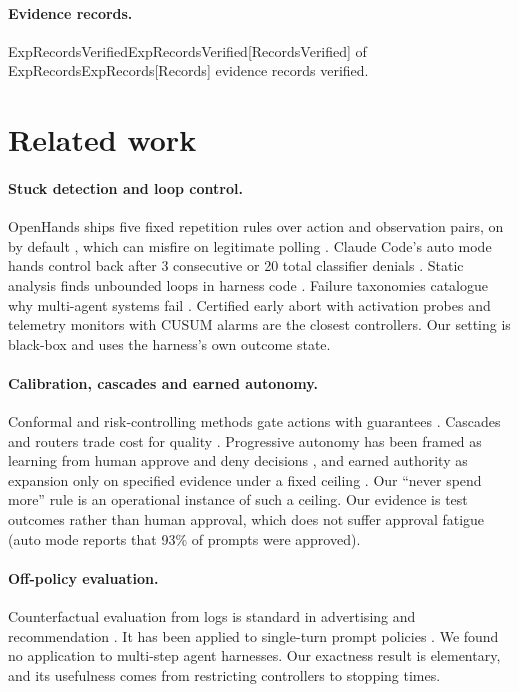 \documentclass[11pt]{article}
\theoremstyle{remark}
\newcommand{\tbd}[1]{\textcolor{red!70!black}{[#1]}}
\newcommand{\expval}[1]{\ifcsname Exp#1\endcsname\csname Exp#1\endcsname\else\tbd{#1}\fi}
\begin{document}
\paragraph{Evidence records.} \expval{RecordsVerified} of \expval{Records} evidence records verified.

\section{Related work}
\label{sec:related}

\paragraph{Stuck detection and loop control.}
OpenHands ships five fixed repetition rules over action and observation pairs, on by default \citep{openhands2026stuck}, which can misfire on legitimate polling \citep{openhands2026issue762}. Claude Code's auto mode hands control back after 3 consecutive or 20 total classifier denials \citep{anthropic2026automode}. Static analysis finds unbounded loops in harness code \citep{hou2026ial}. Failure taxonomies catalogue why multi-agent systems fail \citep{cemri2025mast}. Certified early abort with activation probes \citep{ruan2026doomed} and telemetry monitors with CUSUM alarms \citep{dubey2026realtime} are the closest controllers. Our setting is black-box and uses the harness's own outcome state.

\paragraph{Calibration, cascades and earned autonomy.}
Conformal and risk-controlling methods gate actions with guarantees \citep{ren2023knowno,angelopoulos2022crc,angelopoulos2021ltt,rahman2026rolestratified}. Cascades and routers trade cost for quality \citep{chen2023frugalgpt,madaan2023automix,ong2024routellm}. Progressive autonomy has been framed as learning from human approve and deny decisions \citep{ou2026progressive}, and earned authority as expansion only on specified evidence under a fixed ceiling \citep{zhang2026authorized}. Our ``never spend more'' rule is an operational instance of such a ceiling. Our evidence is test outcomes rather than human approval, which does not suffer approval fatigue (auto mode reports that 93\% of prompts were approved).

\paragraph{Off-policy evaluation.}
Counterfactual evaluation from logs is standard in advertising and recommendation \citep{li2010contextual,bottou2013counterfactual,dudik2011doubly}. It has been applied to single-turn prompt policies \citep{kiyohara2025ope}. We found no application to multi-step agent harnesses. Our exactness result is elementary, and its usefulness comes from restricting controllers to stopping times.
\end{document}

